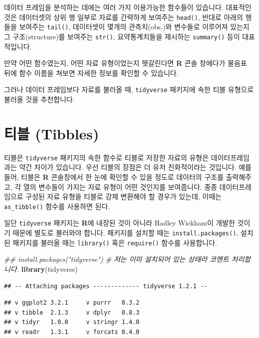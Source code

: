 \documentclass[]{book}
\newenvironment{Shaded}{\begin{snugshade}}{\end{snugshade}}
\newcommand{\CommentTok}[1]{\textcolor[rgb]{0.56,0.35,0.01}{\textit{#1}}}
\newcommand{\KeywordTok}[1]{\textcolor[rgb]{0.13,0.29,0.53}{\textbf{#1}}}
\newcommand{\NormalTok}[1]{#1}
\begin{document}
데이터 프레임을 분석하는 데에는 여러 가지 이용가능한 함수들이 있습니다. 대표적인 것은 데이터셋의 상위 행 일부로 자료를 간략하게 보여주는 \texttt{head()}, 반대로 아래의 행들을 보여주는 \texttt{tail()}, 데이터셋이 몇개의 관측치(obs.)와 변수들로 이루어져 있는지 그 구조(structure)를 보여주는 \texttt{str()}, 요약통계치들을 제시하는 \texttt{summary()} 등이 대표적입니다.

만약 어떤 함수였는지, 어떤 자료 유형이었는지 헷갈린다면 \textbf{R} 콘솔 창에다가 물음표 뒤에 함수 이름을 쳐보면 자세한 정보를 확인할 수 있습니다.

그러나 데이터 프레임보다 자료를 불러올 때, \texttt{tidyverse} 패키지에 속한 티블 유형으로 불러올 것을 추천합니다.

\hypertarget{uxd2f0uxbe14-tibbles}{%
\section{티블 (Tibbles)}\label{uxd2f0uxbe14-tibbles}}

티블은 \texttt{tidyverse} 패키지의 속한 함수로 티블로 저장한 자료의 유형은 데이터프레임과는 약간 차이가 있습니다. 우선 티블의 장점은 더 유저 친화적이라는 것입니다. 예를 들어, 티블은 \textbf{R} 콘솔창에서 한 눈에 확인할 수 있을 정도로 데이터의 구조를 출력해주고, 각 열의 변수들이 가지는 자료 유형이 어떤 것인지를 보여줍니다. 종종 데이터프레임으로 구성된 자료 유형을 티블로 강제 변환해야 할 경우가 있는데, 이때는 \texttt{as\_tibble()} 함수를 사용하면 된다.

일단 \texttt{tidyverse} 패키지는 \textbf{R}에 내장된 것이 아니라 Hadley Wickham이 개발한 것이기 때문에 별도로 불러와야 합니다. 패키지를 설치할 때는 \texttt{install.packages()}, 설치된 패키지를 불러올 때는 \texttt{library()} 혹은 \texttt{require()} 함수를 사용합니다.

\begin{Shaded}
\begin{Highlighting}[]
\CommentTok{## install.packages("tidyverse") # 저는 이미 설치되어 있는 상태라 코멘트 처리합니다.}
\KeywordTok{library}\NormalTok{(tidyverse)}
\end{Highlighting}
\end{Shaded}

\begin{verbatim}
## -- Attaching packages ------------- tidyverse 1.2.1 --
\end{verbatim}

\begin{verbatim}
## v ggplot2 3.2.1     v purrr   0.3.2
## v tibble  2.1.3     v dplyr   0.8.3
## v tidyr   1.0.0     v stringr 1.4.0
## v readr   1.3.1     v forcats 0.4.0
\end{verbatim}
\end{document}
